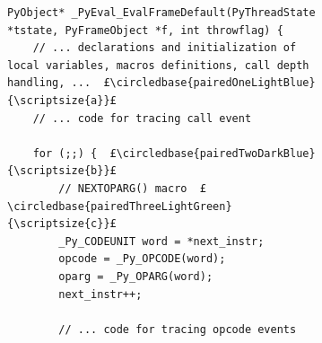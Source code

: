 \begin{figure}[H]
    \centering
    \begin{subfigure}[b]{0.65\textwidth}
        \centering
        \begin{verbatim}
PyObject* _PyEval_EvalFrameDefault(PyThreadState *tstate, PyFrameObject *f, int throwflag) {
    // ... declarations and initialization of local variables, macros definitions, call depth handling, ...  £\circledbase{pairedOneLightBlue}{\scriptsize{a}}£
    // ... code for tracing call event

    for (;;) {  £\circledbase{pairedTwoDarkBlue}{\scriptsize{b}}£
        // NEXTOPARG() macro  £\circledbase{pairedThreeLightGreen}{\scriptsize{c}}£
        _Py_CODEUNIT word = *next_instr;
        opcode = _Py_OPCODE(word);
        oparg = _Py_OPARG(word);
        next_instr++;

        // ... code for tracing opcode events


\end{verbatim}
\end{subfigure}
\end{figure}
